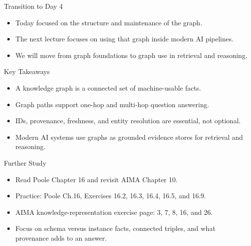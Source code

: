 \documentclass[aspectratio=169]{beamer}
\begin{document}
\begin{frame}{Transition to Day 4}
\begin{itemize}
  \item Today focused on the structure and maintenance of the graph.
  \item The next lecture focuses on using that graph inside modern AI pipelines.
  \item We will move from graph foundations to graph use in retrieval and reasoning.
\end{itemize}
\end{frame}

\begin{frame}{Key Takeaways}
\begin{itemize}
  \item A knowledge graph is a connected set of machine-usable facts.
  \item Graph paths support one-hop and multi-hop question answering.
  \item IDs, provenance, freshness, and entity resolution are essential, not optional.
  \item Modern AI systems use graphs as grounded evidence stores for retrieval and reasoning.
\end{itemize}
\end{frame}

\begin{frame}{Further Study}
\begin{itemize}
  \item Read Poole Chapter 16 and revisit AIMA Chapter 10.
  \item Practice: Poole Ch.16, Exercises 16.2, 16.3, 16.4, 16.5, and 16.9.
  \item AIMA knowledge-representation exercise page: 3, 7, 8, 16, and 26.
  \item Focus on schema versus instance facts, connected triples, and what provenance adds to an answer.
\end{itemize}
\end{frame}
\end{document}
